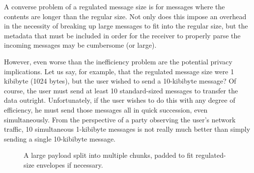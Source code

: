 A converse problem of a regulated message size is for messages where the contents are longer than the regular size. Not only does this impose an overhead in the necessity of breaking up large messages to fit into the regular size, but the metadata that must be included in order for the receiver to properly parse the incoming messages may be cumbersome (or large).

However, even worse than the inefficiency problem are the potential privacy implications. Let us say, for example, that the regulated message size were 1 kibibyte (1024 bytes), but the user wished to send a 10-kibibyte message? Of course, the user must send at least 10 standard-sized messages to transfer the data outright. Unfortunately, if the user wishes to do this with any degree of efficiency, he must send those messages all in quick succession, even simultaneously. From the perspective of a party observing the user's network traffic, 10 simultaneous 1-kibibyte messages is not really much better than simply sending a single 10-kibibyte message.

\begin{figure}[h!]
    \centering
    \caption{A large payload split into multiple chunks, padded to fit regulated-size envelopes if necessary.}
    \label{fig:payload_chunks}
\end{figure}


